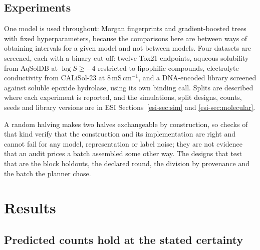 \documentclass[twocolumn,10pt]{article}
\begin{document}
\subsection{Experiments}
\label{sec:methods:data}

One model is used throughout: Morgan fingerprints and gradient-boosted trees with fixed
hyperparameters,\citep{RDKit,Rogers2010Morgan,Prokhorenkova2018CatBoost} because the comparisons
here are between ways of obtaining intervals for a given model and not between models. Four datasets
are screened, each with a binary cut-off: twelve Tox21 endpoints,\citep{Huang2016Tox21,Mayr2016DeepTox}
aqueous solubility from AqSolDB at $\log S\ge-4$ restricted to lipophilic
compounds,\citep{Sorkun2019AqSolDB} electrolyte conductivity from CALiSol-23 at
$8\,\mathrm{mS\,cm^{-1}}$,\citep{deBlasio2024CALiSol} and a DNA-encoded library screened against
soluble epoxide hydrolase, using its own binding call.\citep{Quigley2024BELKA} Splits are
described where each experiment is reported, and the simulations, split designs, counts, seeds and
library versions are in ESI Sections~\ref{esi-sec:sim} and \ref{esi-sec:molecular}.

A random halving makes two halves exchangeable by construction, so checks of that kind verify
that the construction and its implementation are right and cannot fail for any model,
representation or label noise; they are not evidence that an audit prices a batch assembled some
other way. The designs that test that are the block holdouts, the declared round, the division by
provenance and the batch the planner chose.

\section{Results}
\label{sec:results}

\subsection{Predicted counts hold at the stated certainty}
\label{sec:results:intervals}
\end{document}

